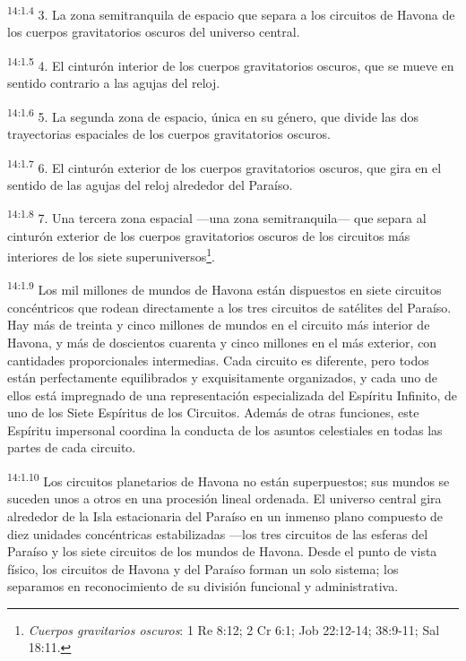 \par
\textsuperscript{14:1.4} 3. La zona semitranquila de espacio que separa a los circuitos de Havona de los cuerpos gravitatorios oscuros del universo central.

\par
\textsuperscript{14:1.5} 4. El cinturón interior de los cuerpos gravitatorios oscuros, que se mueve en sentido contrario a las agujas del reloj.

\par
\textsuperscript{14:1.6} 5. La segunda zona de espacio, única en su género, que divide las dos trayectorias espaciales de los cuerpos gravitatorios oscuros.

\par
\textsuperscript{14:1.7} 6. El cinturón exterior de los cuerpos gravitatorios oscuros, que gira en el sentido de las agujas del reloj alrededor del Paraíso.

\par
\textsuperscript{14:1.8} 7. Una tercera zona espacial ---una zona semitranquila--- que separa al cinturón exterior de los cuerpos gravitatorios oscuros de los circuitos más interiores de los siete superuniversos\footnote{\textit{Cuerpos gravitarios oscuros}: 1 Re 8:12; 2 Cr 6:1; Job 22:12-14; 38:9-11; Sal 18:11.}.

\par
\textsuperscript{14:1.9} Los mil millones de mundos de Havona están dispuestos en siete circuitos concéntricos que rodean directamente a los tres circuitos de satélites del Paraíso. Hay más de treinta y cinco millones de mundos en el circuito más interior de Havona, y más de doscientos cuarenta y cinco millones en el más exterior, con cantidades proporcionales intermedias. Cada circuito es diferente, pero todos están perfectamente equilibrados y exquisitamente organizados, y cada uno de ellos está impregnado de una representación especializada del Espíritu Infinito, de uno de los Siete Espíritus de los Circuitos. Además de otras funciones, este Espíritu impersonal coordina la conducta de los asuntos celestiales en todas las partes de cada circuito.

\par
\textsuperscript{14:1.10} Los circuitos planetarios de Havona no están superpuestos; sus mundos se suceden unos a otros en una procesión lineal ordenada. El universo central gira alrededor de la Isla estacionaria del Paraíso en un inmenso plano compuesto de diez unidades concéntricas estabilizadas ---los tres circuitos de las esferas del Paraíso y los siete circuitos de los mundos de Havona. Desde el punto de vista físico, los circuitos de Havona y del Paraíso forman un solo sistema; los separamos en reconocimiento de su división funcional y administrativa.

